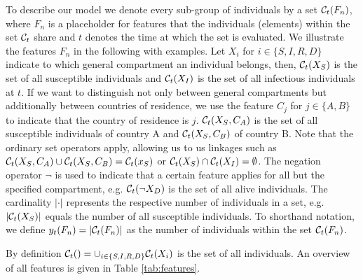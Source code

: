 To describe our model we denote every sub-group of individuals by a set $\mathcal{C}_t(F_n)$, where $F_n$ is a placeholder for features that the individuals (elements) within the set $\mathcal{C}_t$ share and $t$ denotes the time at which the set is evaluated. We illustrate the features $F_n$ in the following with examples. Let $X_i$ for $i \in \{S, I, R, D \}$ indicate to which general compartment an individual belongs, then, $\mathcal{C}_t(X_S)$ is the set of all susceptible individuals and $\mathcal{C}_t(X_I)$ is the set of all infectious individuals at $t$. If we want to distinguish not only between general compartments but additionally between countries of residence, we use the feature $C_j$ for $j \in \{A, B\}$ to indicate that the country of residence is $j$. $\mathcal{C}_t(X_S, C_A)$ is the set of all susceptible individuals of country A and $\mathcal{C}_t(X_S, C_B)$ of country B. Note that the ordinary set operators apply, allowing us to us linkages such as $\mathcal{C}_t(X_S, C_A) \cup \mathcal{C}_t(X_S, C_B) = \mathcal{C}_t(x_S)$ or $\mathcal{C}_t(X_S) \cap \mathcal{C}_t(X_I) = \emptyset$. The negation operator $\neg$ is used to indicate that a certain feature applies for all but the specified compartment, e.g. $\mathcal{C}_t(\neg X_D)$ is the set of all alive individuals. The cardinality $|\cdot|$ represents the respective number of individuals in a set, e.g. $|\mathcal{C}_t(X_S)|$ equals the number of all susceptible individuals. To shorthand notation, we define $y_t(F_n) = |\mathcal{C}_t(F_n)|$ as the number of individuals within the set $\mathcal{C}_t(F_n)$. 

By definition $\mathcal{C}_t() = \cup_{i \in \{ S, I, R,D\}} \mathcal{C}_t(X_i)$ is the set of all individuals. An overview of all features is given in Table \ref{tab:features}. 


